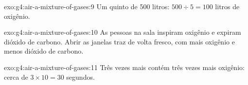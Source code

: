 \begin{solution}{exo:g4:air-a-mixture-of-gases:9}
Um quinto de 500 litros: $500 \div 5 = 100$ litros de oxigênio.
\end{solution}

\begin{solution}{exo:g4:air-a-mixture-of-gases:10}
As pessoas na sala inspiram oxigênio e expiram dióxido de carbono. Abrir
as janelas traz de volta  fresco, com mais oxigênio e menos dióxido de
carbono.
\end{solution}

\begin{solution}{exo:g4:air-a-mixture-of-gases:11}
Três vezes mais  contém três vezes mais oxigênio: cerca de
$3 \times 10 = 30$ segundos.
\end{solution}
